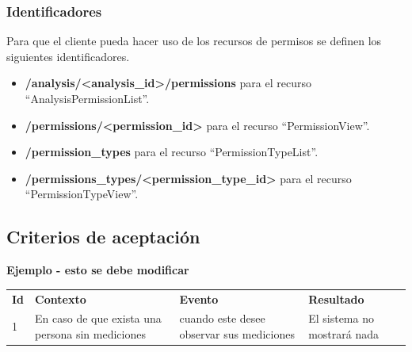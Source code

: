 \subsubsection{Identificadores}

	Para que el cliente pueda hacer uso de los recursos de permisos se definen los siguientes identificadores.
	\begin{itemize}
		\item \textbf{/analysis/<analysis\_id>/permissions} para el recurso ``AnalysisPermissionList''.
		\item \textbf{/permissions/<permission\_id>} para el recurso ``PermissionView''.
		\item \textbf{/permission\_types} para el recurso ``PermissionTypeList''.
		\item \textbf{/permissions\_types/<permission\_type\_id>} para el recurso ``PermissionTypeView''.
	\end{itemize}

\subsection{Criterios de aceptación}
\textbf{Ejemplo - esto se debe modificar}


\begin{center}
\begin{longtable}{|p{0.5cm}|p{4cm}|p{4cm}|p{5cm}|}
\hline \hline \rowcolor[gray]{0.9}
	\multicolumn{4}{||c|}{\textbf{Criterio de aceptación}} \\
    \hline  \rowcolor[gray]{0.9}
        \textbf{Id} &
        \textbf{Contexto} &
        \textbf{Evento}&
        \textbf{Resultado} \\
    \hline
1&En caso de que exista una persona sin mediciones & cuando este desee observar sus mediciones  & El sistema no mostrará nada \\ \hline
 

  \end{longtable}
\end{center}


